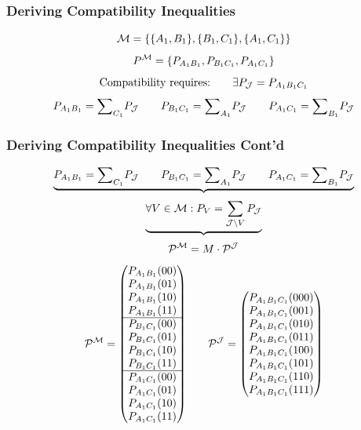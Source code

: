 \documentclass[
    hyperref={bookmarks=false},%
    xcolor={dvipsnames},
]{beamer}
\renewcommand{\tcdot}{\cdot} %
\begin{document}
\makeatother
\begin{frame}
    \frametitle{Deriving Compatibility Inequalities}
    \begin{center}
        \scalebox{0.8}{}
    \end{center}
    \[ \mscenario = \bc{\bc{A_1, B_1}, \bc{B_1, C_1}, \bc{A_1, C_1}} \]
    \[ \prob^{\mscenario} = \bc{\prob[A_1B_1], \prob[B_1C_1], \prob[A_1C_1]} \]
    \[ \text{Compatibility requires:} \qquad \exists \prob[\jointvar] = \prob[A_1B_1C_1] \]
    \[ \prob[A_1B_1] = {\sum}_{C_1} \prob[\jointvar] \qquad \prob[B_1C_1] = {\sum}_{A_1} \prob[\jointvar] \qquad \prob[A_1C_1] = {\sum}_{B_1} \prob[\jointvar]\]
\end{frame}

\begin{frame}[shrink=13]
    \frametitle{Deriving Compatibility Inequalities Cont'd}
    \[ \underbrace{\prob[A_1B_1] = {\sum}_{C_1} \prob[\jointvar] \qquad \prob[B_1C_1] = {\sum}_{A_1} \prob[\jointvar] \qquad \prob[A_1C_1] = {\sum}_{B_1} \prob[\jointvar]} \]
    \[ \underbrace{\forall V \in \mscenario: \prob[V] = \sum_{\jointvar \setminus V} \prob[\jointvar] }\]
    \[ \probvec^{\mscenario} = M \tcdot \probvec^{\jointvar}  \]
    \[ \probvec^{\mscenario} =
        \begin{pmatrix}
            \prob[A_1B_1][00] \\
            \prob[A_1B_1][01] \\
            \prob[A_1B_1][10] \\
            \prob[A_1B_1][11] \\
            \hline
            \prob[B_1C_1][00] \\
            \prob[B_1C_1][01] \\
            \prob[B_1C_1][10] \\
            \prob[B_1C_1][11] \\
            \hline
            \prob[A_1C_1][00] \\
            \prob[A_1C_1][01] \\
            \prob[A_1C_1][10] \\
            \prob[A_1C_1][11] \\
        \end{pmatrix}
        \qquad
        \probvec^{\jointvar} =
        \begin{pmatrix}
            \prob[A_1B_1C_1][000] \\
            \prob[A_1B_1C_1][001] \\
            \prob[A_1B_1C_1][010] \\
            \prob[A_1B_1C_1][011] \\
            \prob[A_1B_1C_1][100] \\
            \prob[A_1B_1C_1][101] \\
            \prob[A_1B_1C_1][110] \\
            \prob[A_1B_1C_1][111] \\
        \end{pmatrix}
    \]
\end{frame}
\end{document}
